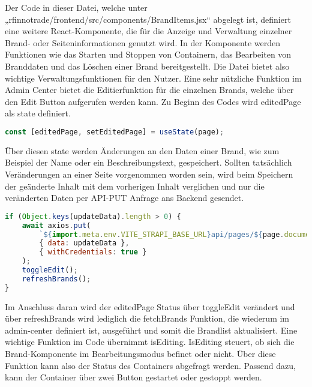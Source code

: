 Der Code in dieser Datei, welche unter „rfinnotrade/frontend/src/components/BrandItems.jsx“ abgelegt ist, definiert eine weitere React-Komponente, die für die Anzeige und Verwaltung einzelner Brand- oder Seiteninformationen genutzt wird.
In der Komponente werden Funktionen wie das Starten und Stoppen von Containern, das Bearbeiten von Branddaten und das Löschen einer Brand bereitgestellt. Die Datei bietet also wichtige Verwaltungsfunktionen für den Nutzer.
Eine sehr nützliche Funktion im Admin Center bietet die Editierfunktion für die einzelnen Brands, welche über den Edit Button aufgerufen werden kann.
Zu Beginn des Codes wird editedPage als state definiert.

\begin{lstlisting}[language=JavaScript, caption={branditem.jsx}, label={lst:branditemjsx}]
const [editedPage, setEditedPage] = useState(page);
\end{lstlisting}

Über diesen state werden Änderungen an den Daten einer Brand, wie zum Beispiel der Name oder ein Beschreibungstext, gespeichert. 
Sollten tatsächlich Veränderungen an einer Seite vorgenommen worden sein, wird beim Speichern der geänderte Inhalt mit dem vorherigen Inhalt verglichen und nur die veränderten Daten per API-PUT Anfrage ans Backend gesendet.

\begin{lstlisting}[language=JavaScript, caption={branditem.jsx Editierung}, label={lst:branditemjsxEditierung}]
if (Object.keys(updateData).length > 0) {
    await axios.put(
        `${import.meta.env.VITE_STRAPI_BASE_URL}api/pages/${page.documentId}`,
        { data: updateData },
        { withCredentials: true }
    );
    toggleEdit();
    refreshBrands();
}
\end{lstlisting}

Im Anschluss daran wird der editedPage Status über toggleEdit verändert und über refreshBrands wird lediglich die fetchBrands Funktion, die wiederum im admin-center definiert ist, ausgeführt und somit die Brandlist aktualisiert.
Eine wichtige Funktion im Code übernimmt isEditing. IsEditing steuert, ob sich die Brand-Komponente im Bearbeitungsmodus befinet oder nicht. Über diese Funktion kann also der Status des Containers abgefragt werden.
Passend dazu, kann der Container über zwei Button gestartet oder gestoppt werden.

